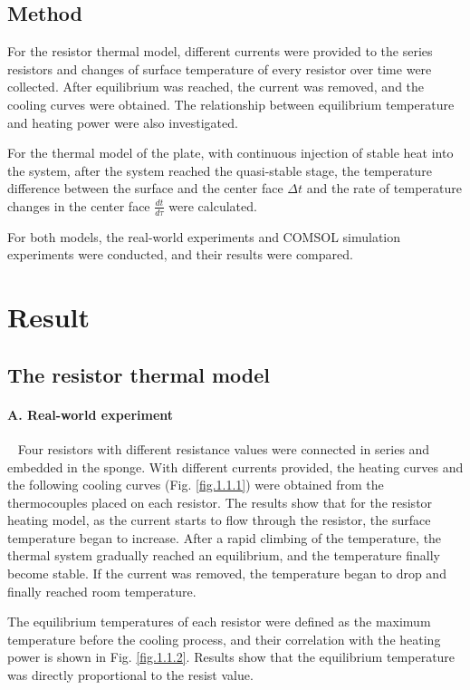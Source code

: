 \documentclass[10pt,a4paper,twocolumn,twoside,UTF8]{article}
\begin{document}
	\subsection{Method}
	For the resistor thermal model, different currents were provided to the series resistors and changes of surface temperature of every resistor over time were collected. 
	After equilibrium was reached, the current was removed, and the cooling curves were obtained. The relationship between equilibrium temperature and heating power were also investigated.

	For the thermal model of the plate, with continuous injection of stable heat into the system, after the system reached the quasi-stable stage, 
	the temperature difference between the surface and the center face $\Delta t$ and the rate of temperature changes in the center face $\frac{dt}{d\tau}$ were calculated.

	For both models, the real-world experiments and COMSOL simulation experiments were conducted, and their results were compared.


\section{Result}
	\subsection{The resistor thermal model}
	\paragraph{A. Real-world experiment}~
	\newline 
	\indent
	Four resistors with different resistance values were connected in series and embedded in the sponge. 
	With different currents provided, the heating curves and the following cooling curves (Fig. \ref{fig.1.1.1}) were obtained from the thermocouples placed on each resistor.
	The results show that for the resistor heating model, as the current starts to flow through the resistor, the surface temperature began to increase.
	After a rapid climbing of the temperature, the thermal system gradually reached an equilibrium, and the temperature finally become stable.
	If the current was removed, the temperature began to drop and finally reached room temperature.

	The equilibrium temperatures of each resistor were defined as the maximum temperature before the cooling process, 
	and their correlation with the heating power is shown in Fig. \ref{fig.1.1.2}.
	Results show that the equilibrium temperature was directly proportional to the resist value.
\end{document}
